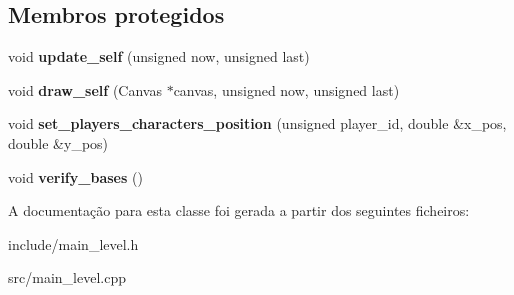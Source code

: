 \subsection*{Membros protegidos}
\begin{DoxyCompactItemize}
\item 
\mbox{\label{classMainLevel_a4978a0e152f6a7b55bed0bad74dc7d5a}} 
void {\bfseries update\+\_\+self} (unsigned now, unsigned last)
\item 
\mbox{\label{classMainLevel_aabad926cf0366de353d716065ab792ad}} 
void {\bfseries draw\+\_\+self} (Canvas $\ast$canvas, unsigned now, unsigned last)
\item 
\mbox{\label{classMainLevel_a8b5a146b3b3186081ca2a0ad49bbad29}} 
void {\bfseries set\+\_\+players\+\_\+characters\+\_\+position} (unsigned player\+\_\+id, double \&x\+\_\+pos, double \&y\+\_\+pos)
\item 
\mbox{\label{classMainLevel_a89ed36254771a662797d0ec50105015f}} 
void {\bfseries verify\+\_\+bases} ()
\end{DoxyCompactItemize}


A documentação para esta classe foi gerada a partir dos seguintes ficheiros\+:\begin{DoxyCompactItemize}
\item 
include/main\+\_\+level.\+h\item 
src/main\+\_\+level.\+cpp\end{DoxyCompactItemize}
